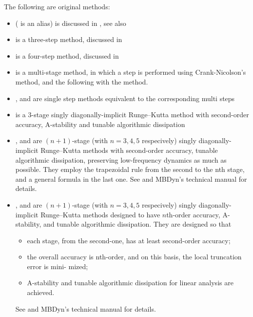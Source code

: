 The following are original methods:
\begin{itemize}
\item {} ( is an alias) is discussed in \cite{MASARATI-LANZ-MANTEGAZZA-2001},
see also
\begin{quote}
\end{quote}
\item {} is a three-step method, discussed in \cite{ZHANG-2021-COMPMECH-MS34}
\item {} is a four-step method, discussed in \cite{ZHANG-2021-COMPMECH-MS34}
\item {} is a multi-stage method, in which a step is performed using Crank-Nicolson's method, and the following with the  method.
\item {},  and  are single step methods equivalent to the corresponding multi steps
\item {} is a 3-stage singly diagonally-implicit Runge--Kutta method with
second-order accuracy, A-stability and tunable algorithmic dissipation
\item {},  and  are $(n + 1)$-stage (with $n=3,4,5$ respecively) 
singly diagonally-implicit Runge--Kutta methods with second-order accuracy, 
tunable algorithmic dissipation, preserving low-frequency dynamics as much as
possible. They employ the trapezoidal rule from the second to the nth stage, and a general
formula in the last one. See \cite{zhang_optimization_2020, zhang_performance_2022} and MBDyn's technical manual for details.
\item {},  and  are  $(n + 1)$-stage  (with $n=3,4,5$ respecively)
singly diagonally-implicit Runge--Kutta methods designed to have $n$th-order accuracy, A-stability, and tunable algorithmic
dissipation. They are designed so that
\begin{itemize}
\item each stage, from the second-one, has at least second-order accuracy;
\item the overall accuracy is nth-order, and on this basis, the local truncation error is mini-
mized;
\item A-stability and tunable algorithmic dissipation for linear analysis are achieved.
\end{itemize}
See \cite{zhang_optimization_2020, zhang_performance_2022} and MBDyn's technical manual for details.
\end{itemize}
